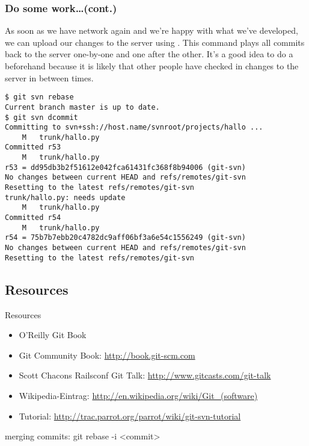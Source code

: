\begin{frame}[fragile]
\frametitle{Do some work\ldots (cont.)}

As soon as we have network again and we're happy with what we've developed,
we can upload our changes to the server using .
This command plays all commits back to the server one-by-one and one after
the other.  It's a good idea to do a  beforehand
because it is likely that other people have checked in changes to the server
in between times.
\begin{lstlisting}[basicstyle=\tiny\ttfamily\color{black}]
$ git svn rebase
Current branch master is up to date.
$ git svn dcommit
Committing to svn+ssh://host.name/svnroot/projects/hallo ...
    M   trunk/hallo.py
Committed r53
    M   trunk/hallo.py
r53 = dd95db3b2f51612e042fca61431fc368f8b94006 (git-svn)
No changes between current HEAD and refs/remotes/git-svn
Resetting to the latest refs/remotes/git-svn
trunk/hallo.py: needs update
    M   trunk/hallo.py
Committed r54
    M   trunk/hallo.py
r54 = 75b7b7ebb20c4782dc9aff06bf3a6e54c1556249 (git-svn)
No changes between current HEAD and refs/remotes/git-svn
Resetting to the latest refs/remotes/git-svn
\end{lstlisting}

\end{frame}

\subsection{Resources}
\begin{frame}{Resources}
\begin{itemize}
\item O'Reilly Git Book
\item Git Community Book: \url{http://book.git-scm.com}
\item Scott Chacons Railsconf Git Talk:
    \url{http://www.gitcasts.com/git-talk}
\item Wikipedia-Eintrag: \url{http://en.wikipedia.org/wiki/Git_(software)}
\item {} Tutorial:
    \url{http://trac.parrot.org/parrot/wiki/git-svn-tutorial}
\end{itemize}
\end{frame}


merging commits:  git rebase -i <commit>

